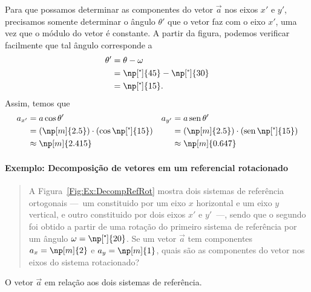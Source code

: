 Para que possamos determinar as componentes do vetor $\vec{a}$ nos eixos $x'$ e $y'$, precisamos somente determinar o ângulo $\theta'$ que o vetor faz com o eixo $x'$, uma vez que o módulo do vetor é constante. A partir da figura, podemos verificar facilmente que tal ângulo corresponde a
\begin{align}
    \theta' &= \theta - \omega \\
    &= \np[\tcdegree]{45} - \np[\tcdegree]{30} \\
    &= \np[\tcdegree]{15}.
\end{align}
%
Assim, temos que
\begin{align}
    a_{x'} &= a\cos\theta' & a_{y'} &= a\sen\theta' \\
    &= (\np[m]{2.5})\cdot(\cos\np[\tcdegree]{15}) & &= (\np[m]{2.5})\cdot(\sen\np[\tcdegree]{15}) \\
    &\approx \np[m]{2.415} & &\approx \np[m]{0.647}
\end{align}

\paragraph{Exemplo: Decomposição de vetores em um referencial rotacionado}

\begin{quote}
    A Figura~\ref{Fig:Ex:DecompRefRot} mostra dois sistemas de referência ortogonais ---~um constituido por um eixo $x$ horizontal e um eixo $y$ vertical, e outro constituido por dois eixos $x'$ e $y'$~---, sendo que o segundo foi obtido a partir de uma rotação do primeiro sistema de referência por um ângulo $\omega = \np[\tcdegree]{20}$. Se um vetor $\vec{a}$ tem componentes $a_x = \np[m]{2}$ e $a_y = \np[m]{1}$, quais são as componentes do vetor nos eixos do sistema rotacionado?
\end{quote}

\begin{marginfigure}[3cm]
\centering
{}
\caption{O vetor $\vec{a}$ em relação aos dois sistemas de referência. \label{Fig:Ex:DecompRefRotModAng}}
\end{marginfigure}

